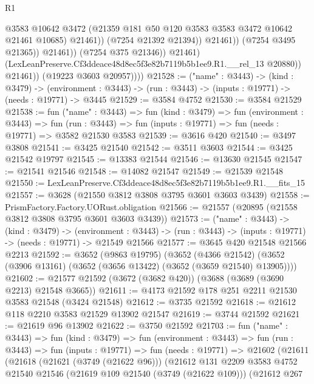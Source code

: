 \begin{lexlean}{R1}
\begin{coremodule}
                                    @3583
                                    @10642
                                    @3472
                                    (@21359 @181 @50 @120 @3583 @3583 @3472 @10642 @21461 @10685)
                                    @21461))
                                (@7254 @21392 @21394))
                              @21461))
                          (@7254 @3495 @21365))
                        @21461))
                    (@7254 @375 @21346))
                  @21461)
                (LexLeanPreserve.Cf3ddeace48d8ec5f3e82b7119b5b1ee9.R1.__rel_13 @20880))
              @21461))
          (@19223 @3603 @20957))))
@21528 := ("name" : @3443) ->
  (kind : @3479) ->
  (environment : @3443) -> (run : @3443) -> (inputs : @19771) -> (needs : @19771) -> @3445
@21529 := @3584 @4752
@21530 := @3584 @21529
@21538 := fun ("name" : @3443) =>
  fun (kind : @3479) =>
  fun (environment : @3443) =>
  fun (run : @3443) => fun (inputs : @19771) => fun (needs : @19771) => @3582 @21530 @3583
@21539 := @3616 @420
@21540 := @3497 @3808
@21541 := @3425 @21540
@21542 := @3511 @3603
@21544 := @3425 @21542 @19797
@21545 := @13383 @21544
@21546 := @13630 @21545
@21547 := @21541 @21546
@21548 := @14082 @21547
@21549 := @21539 @21548
@21550 := LexLeanPreserve.Cf3ddeace48d8ec5f3e82b7119b5b1ee9.R1.__fits_15
@21557 := @3628 (@21550 @3812 @3808 @3795 @3601 @3603 @3439)
@21558 := PrismFactory.Factory.UORust.obligation
@21566 := @21557 (@20895 (@21558 @3812 @3808 @3795 @3601 @3603 @3439))
@21573 := ("name" : @3443) ->
  (kind : @3479) ->
  (environment : @3443) -> (run : @3443) -> (inputs : @19771) -> (needs : @19771) -> @21549 @21566
@21577 := @3645 @420 @21548 @21566 @2213
@21592 := @3652
    (@9863 @19795)
    (@3652
      (@4366 @21542)
      (@3652 (@3906 @13161) (@3652 (@3656 @13422) (@3652 (@3659 @21540) @13905))))
@21602 := @21577 @21592 (@3672 (@3682 @420)) (@3688 (@3689 (@3690 @2213) @21548 @3665))
@21611 := @4173 @21592 @178 @251 @2211 @21530 @3583 @21548 (@3424 @21548)
@21612 := @3735 @21592
@21618 := @21612 @118 @2210 @3583 @21529 @13902 @21547
@21619 := @3744 @21592
@21621 := @21619 @96 @13902
@21622 := @3750 @21592
@21703 := fun ("name" : @3443) =>
  fun (kind : @3479) =>
  fun (environment : @3443) =>
  fun (run : @3443) =>
  fun (inputs : @19771) =>
  fun (needs : @19771) =>
  @21602
    (@21611
      (@21618
        (@21621 (@3749 (@21622 @96)))
        (@21612
          @131
          @2209
          @3583
          @4752
          @21540
          @21546
          (@21619 @109 @21540 (@3749 (@21622 @109)))
          (@21612
            @267

\end{coremodule}
\end{lexlean}
